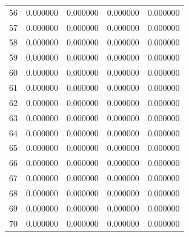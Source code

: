 \begin{tabular}{lrrrr}
56 & 0.000000 & 0.000000 & 0.000000 & 0.000000 \\
57 & 0.000000 & 0.000000 & 0.000000 & 0.000000 \\
58 & 0.000000 & 0.000000 & 0.000000 & 0.000000 \\
59 & 0.000000 & 0.000000 & 0.000000 & 0.000000 \\
60 & 0.000000 & 0.000000 & 0.000000 & 0.000000 \\
61 & 0.000000 & 0.000000 & 0.000000 & 0.000000 \\
62 & 0.000000 & 0.000000 & 0.000000 & 0.000000 \\
63 & 0.000000 & 0.000000 & 0.000000 & 0.000000 \\
64 & 0.000000 & 0.000000 & 0.000000 & 0.000000 \\
65 & 0.000000 & 0.000000 & 0.000000 & 0.000000 \\
66 & 0.000000 & 0.000000 & 0.000000 & 0.000000 \\
67 & 0.000000 & 0.000000 & 0.000000 & 0.000000 \\
68 & 0.000000 & 0.000000 & 0.000000 & 0.000000 \\
69 & 0.000000 & 0.000000 & 0.000000 & 0.000000 \\
70 & 0.000000 & 0.000000 & 0.000000 & 0.000000 \\
\bottomrule
\end{tabular}

